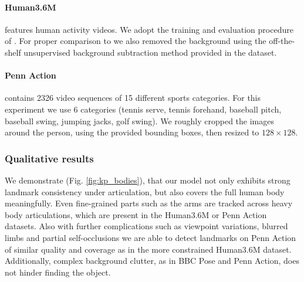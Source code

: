 			\paragraph{Human3.6M} \cite{ionescu14human36m} features human activity videos.
			We adopt the training and evaluation procedure of \cite{zhang18}.
			For proper comparison to \cite{zhang18} we also removed the background using the off-the-shelf unsupervised background subtraction method provided in the dataset.


			\paragraph{Penn Action} \cite{zhang13penn} contains 2326 video sequences of 15 different sports categories.
			For this experiment we use 6 categories (tennis serve, tennis forehand, baseball pitch, baseball swing, jumping jacks, golf swing).
			We roughly cropped the images around the person, using the provided bounding boxes, then resized to $128\times128$.

		\subsubsection{Qualitative results}
			We demonstrate (Fig. \ref{fig:kp_bodies}), that our model not only exhibits strong landmark consistency under articulation, but also covers the full human body meaningfully.
			Even fine-grained parts such as the arms are tracked across heavy body articulations, which are present in the Human3.6M or Penn Action datasets.
			Also with further complications such as viewpoint variations, blurred limbs and partial self-occlusions we are able to detect landmarks on Penn Action of similar quality and coverage as in the more constrained Human3.6M dataset.
			Additionally, complex background clutter, as in BBC Pose and Penn Action, does not hinder finding the object.

